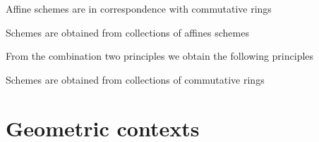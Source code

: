 \documentclass[../main.tex]{subfiles}
\begin{document}
\begin{prcp*}
    Affine schemes are in correspondence with commutative rings
\end{prcp*}
\begin{prcp*}
    Schemes are obtained from collections of affines schemes
\end{prcp*}


From the combination two principles we obtain the following principles

\begin{prcp*}
    Schemes are obtained from collections of commutative rings
\end{prcp*}



\section{Geometric contexts}
\end{document}

